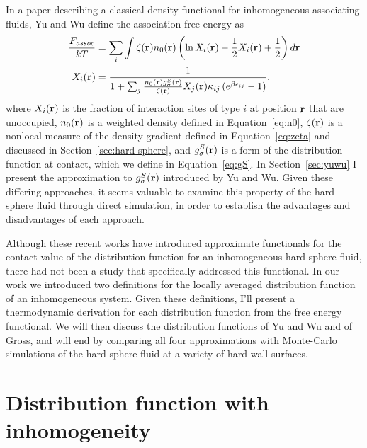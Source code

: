 In a paper describing a classical density functional for
inhomogeneous associating
fluids\cite{yu2002fmt-dft-inhomogeneous-associating}, Yu and Wu define
the association free energy as
\begin{align}
  \frac{F_\textit{assoc}}{kT} &= \sum_i \int \zeta(\textbf{r})n_0(\textbf{r}) \left(\ln X_i(\textbf{r}) - \frac12
  X_i(\textbf{r}) + \frac12\right) d\textbf{r} \label{eq:Aassoc} \\
  X_i(\textbf{r}) &= \frac{1}{1 + \sum_j \frac{n_0(\textbf{r}) g_\sigma^{S}(\textbf{r})}{\zeta(\textbf{r})}
                                 X_j(\textbf{r})\kappa_{ij} \left(e^{\beta
                                   \epsilon_{ij}}-1\right)}.
  \label{eq:Aassoctwo}
\end{align}
where $X_i(\textbf{r})$ is the fraction of interaction sites of type $i$ at
position $\textbf{r}$ that are unoccupied, $n_0(\textbf{r})$ is a weighted density
defined in Equation~\ref{eq:n0}, $\zeta(\textbf{r})$ is a nonlocal measure of
the density gradient defined in Equation~\ref{eq:zeta} and discussed
in Section~\ref{sec:hard-sphere}, and $g_\sigma^S(\textbf{r})$ is a form of
the distribution function at contact, which we define in
Equation~\ref{eq:gS}.  In Section~\ref{sec:yuwu} I present the
approximation to $g_\sigma^S(\textbf{r})$ introduced by Yu and Wu.  Given
these differing approaches, it seems valuable to examine this property
of the hard-sphere fluid through direct simulation, in order to
establish the advantages and disadvantages of each approach.

Although these recent works have introduced approximate functionals
for the contact value of the distribution function for an
inhomogeneous hard-sphere
fluid\cite{yu2002fmt-dft-inhomogeneous-associating, gross2009density},
there had not been a study that specifically addressed this
functional.
%
In our work we introduced two definitions for the locally averaged
distribution function of an inhomogeneous system.
%
%
Given these definitions, I'll present a thermodynamic derivation for
each distribution function from the free energy functional.  We will
then discuss the distribution functions of Yu and Wu and of Gross, and
will end by comparing all four approximations with Monte-Carlo
simulations of the hard-sphere fluid at a variety of hard-wall
surfaces.


\section{Distribution function with inhomogeneity}

